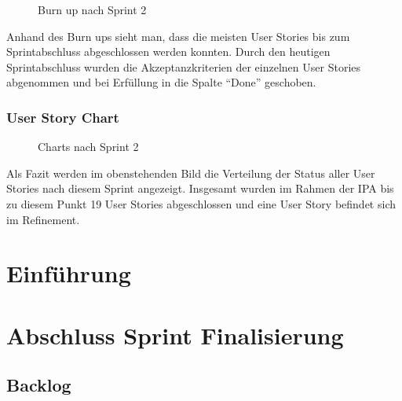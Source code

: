 \begin{figure}[h]
   \centering
   \caption{Burn up nach Sprint 2}
\end{figure}

Anhand des Burn ups sieht man, dass die meisten User Stories bis zum Sprintabschluss abgeschlossen werden konnten. Durch den heutigen
Sprintabschluss wurden die Akzeptanzkriterien der einzelnen User Stories abgenommen und bei Erfüllung in die Spalte ``Done'' geschoben.

\subsection{User Story Chart}
\begin{figure}[h]
   \centering
   \caption{Charts nach Sprint 2}
\end{figure}

Als Fazit werden im obenstehenden Bild die Verteilung der Status aller User Stories nach diesem Sprint angezeigt.
Insgesamt wurden im Rahmen der IPA bis zu diesem Punkt 19 User Stories abgeschlossen und eine User Story befindet sich im Refinement.

\newpage

\chapter{Einführung}

\chapter{Abschluss Sprint Finalisierung}
\section{Backlog}